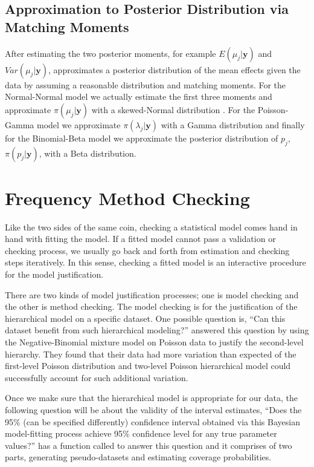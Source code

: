 \documentclass[article]{jss}
\begin{document}
\subsection[Approximation to posterior distribution by moment matching]{Approximation to Posterior Distribution via Matching Moments}
After estimating the two posterior moments, for example $E(\mu_{j}\vert \boldsymbol{y})$ and $Var(\mu_{j}\vert \boldsymbol{y})$,  approximates a posterior distribution of the mean effects given the data by assuming a reasonable distribution and matching moments. For the Normal-Normal model we actually estimate the first three moments and approximate $\pi(\mu_{j}\vert \boldsymbol{y})$ with a skewed-Normal distribution \citep{sn2013}. For the Poisson-Gamma model we approximate $\pi(\lambda_{j}\vert \boldsymbol{y})$ with a Gamma distribution and finally for the Binomial-Beta model we approximate the posterior distribution of $p_{j}$, $\pi(p_{j}\vert \boldsymbol{y})$, with a Beta distribution.


\section[Frequency method checking]{Frequency Method Checking}\label{sec4}
Like the two sides of the same coin, checking a statistical model comes hand in hand with fitting the model. If a fitted model cannot pass a validation or checking process, we usually go back and forth from estimation and checking steps iteratively. In this sense, checking a fitted model is an interactive procedure for the model justification.


There are two kinds of model justification processes; one is model checking and the other is method checking. The model checking is for the justification of the hierarchical model on a specific dataset. One possible question is, ``Can this dataset benefit from such hierarchical modeling?'' \cite{modelchecking1996} answered this question by using the Negative-Binomial mixture model on Poisson data to justify the second-level hierarchy. They found that their data had more variation than expected of the first-level Poisson distribution and two-level Poisson hierarchical model could successfully account for such additional variation.


Once we make sure that the hierarchical model is appropriate for our data, the following question will be about the validity of the interval estimates, ``Does the 95\% (can be specified differently) confidence interval obtained via this Bayesian model-fitting process achieve 95\% confidence level  for any true parameter values?''  has a function called  to answer this question and it comprises of two parts, generating pseudo-datasets and estimating coverage probabilities.
\end{document}
